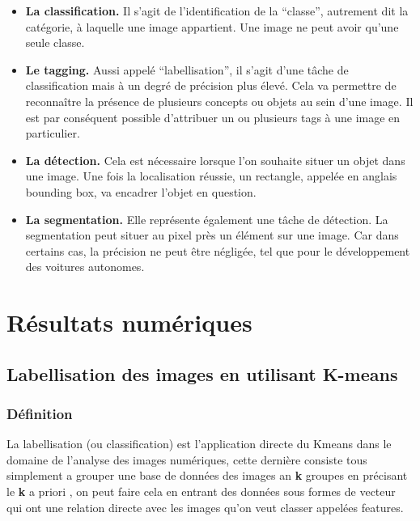 \documentclass[a4paper,12pt]{report}
\begin{document}
\begin{itemize}
    \item \textbf{La classification.} Il s’agit de l’identification de la “classe”, autrement dit la catégorie, à laquelle une image appartient. Une image ne peut avoir qu’une seule classe.\\
    
    \item \textbf{Le tagging.} Aussi appelé “labellisation”, il s’agit d’une tâche de classification mais à un degré de précision plus élevé. Cela va permettre de reconnaître la présence de plusieurs concepts ou objets au sein d’une image. Il est par conséquent possible d’attribuer un ou plusieurs tags à une image en particulier.\\
    
    \item \textbf{La détection.} Cela est nécessaire lorsque l’on souhaite situer un objet dans une image. Une fois la localisation réussie, un rectangle, appelée en anglais bounding box, va encadrer l’objet en question.\\
    
    \item \textbf{La segmentation.} Elle représente également une tâche de détection. La segmentation peut situer au pixel près un élément sur une image. Car dans certains cas, la précision ne peut être négligée, tel que pour le développement des voitures autonomes.\\
\end{itemize}

\chapter{Résultats numériques}

\section{Labellisation des images en utilisant K-means}
\subsection*{Définition }
La labellisation (ou classification) est l'application directe du Kmeans dans le domaine de l'analyse des images numériques, cette dernière consiste tous simplement a grouper une base de données des images an \textbf{k} groupes en précisant le \textbf{k} a priori , on peut faire cela en entrant des données sous formes de vecteur qui ont une relation directe avec les images qu'on veut classer appelées features.
\end{document}
